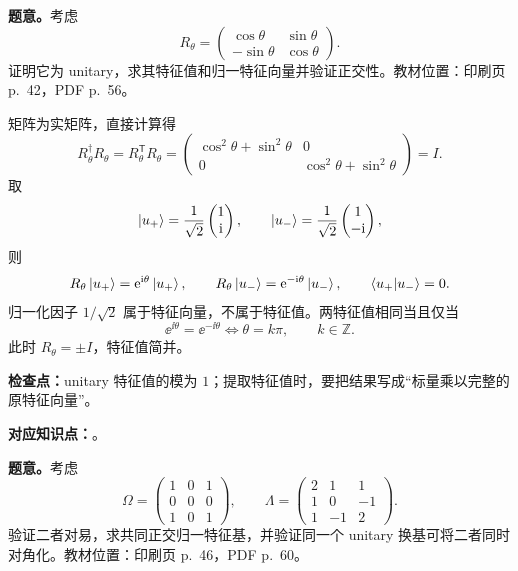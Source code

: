 \textbf{题意。}考虑
\[
  R_\theta=
  \begin{pmatrix}
    \cos\theta&\sin\theta\\
    -\sin\theta&\cos\theta
  \end{pmatrix}.
\]
证明它为 unitary，求其特征值和归一特征向量并验证正交性。教材位置：印刷页 p.~42，PDF p.~56。

\begin{checkedsolution}
矩阵为实矩阵，直接计算得
\[
  R_\theta^\dagger R_\theta
  =R_\theta^{\mathsf T}R_\theta
  =\begin{pmatrix}
    \cos^2\theta+\sin^2\theta&0\\
    0&\cos^2\theta+\sin^2\theta
  \end{pmatrix}=I.
\]
取
\[
  \left|u_+\right\rangle=\frac1{\sqrt2}\begin{pmatrix}1\\\mathrm{i}\end{pmatrix},
  \qquad
  \left|u_-\right\rangle=\frac1{\sqrt2}\begin{pmatrix}1\\-\mathrm{i}\end{pmatrix},
\]
则
\[
  R_\theta\left|u_+\right\rangle=\mathrm{e}^{\mathrm{i}\theta}\left|u_+\right\rangle,
  \qquad
  R_\theta\left|u_-\right\rangle=\mathrm{e}^{-\mathrm{i}\theta}\left|u_-\right\rangle,
  \qquad
  \left\langle u_+ \middle| u_- \right\rangle=0.
\]
归一化因子 $1/\sqrt2$ 属于特征向量，不属于特征值。两特征值相同当且仅当
\[
  \ee^{\ii\theta}=\ee^{-\ii\theta}
  \iff \theta=k\pi,
  \qquad k\in\mathbb Z.
\]
此时 $R_\theta=\pm I$，特征值简并。
\end{checkedsolution}

\textbf{检查点：}unitary 特征值的模为 $1$；提取特征值时，要把结果写成“标量乘以完整的原特征向量”。


\textbf{对应知识点：}。

\textbf{题意。}考虑
\[
  \Omega=
  \begin{pmatrix}
    1&0&1\\0&0&0\\1&0&1
  \end{pmatrix},
  \qquad
  \Lambda=
  \begin{pmatrix}
    2&1&1\\1&0&-1\\1&-1&2
  \end{pmatrix}.
\]
验证二者对易，求共同正交归一特征基，并验证同一个 unitary 换基可将二者同时对角化。教材位置：印刷页 p.~46，PDF p.~60。

